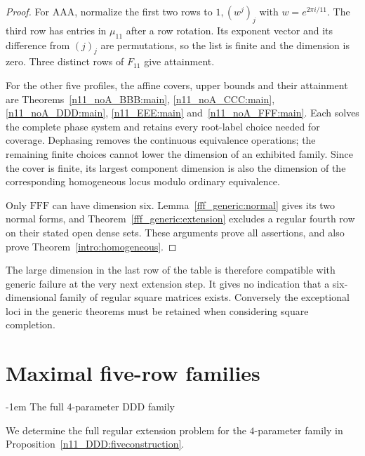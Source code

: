 \documentclass[11pt,a4paper]{article}
\makeatletter
\theoremstyle{plain}
\theoremstyle{definition}
\theoremstyle{plain}
\renewcommand\subsection{\@startsection{subsection}{2}{\z@}  {\medskipamount}  {-1em}  {\normalfont\normalsize\bfseries}}
\makeatother
\begin{document}
\begin{proof}
For $\mathrm{AAA}$, normalize the first two rows to $1,(w^j)_j$ with $w=e^{2\pi i/11}$. The third row has entries in $\mu_{11}$ after a row rotation. Its exponent vector and its difference from $(j)_j$ are permutations, so the list is finite and the dimension is zero. Three distinct rows of $F_{11}$ give attainment.

For the other five profiles, the affine covers, upper bounds and their attainment are Theorems~\ref{n11_noA_BBB:main}, \ref{n11_noA_CCC:main}, \ref{n11_noA_DDD:main}, \ref{n11_EEE:main} and~\ref{n11_noA_FFF:main}. Each solves the complete phase system and retains every root-label choice needed for coverage. Dephasing removes the continuous equivalence operations; the remaining finite choices cannot lower the dimension of an exhibited family. Since the cover is finite, its largest component dimension is also the dimension of the corresponding homogeneous locus modulo ordinary equivalence.

Only $\mathrm{FFF}$ can have dimension six. Lemma~\ref{fff_generic:normal} gives its two normal forms, and Theorem~\ref{fff_generic:extension} excludes a regular fourth row on their stated open dense sets. These arguments prove all assertions, and also prove Theorem~\ref{intro:homogeneous}.
\end{proof}

The large dimension in the last row of the table is therefore compatible with generic failure at the very next extension step. It gives no indication that a six-dimensional family of regular square matrices exists. Conversely the exceptional loci in the generic theorems must be retained when considering square completion.

\section{Maximal five-row families}\label{sec:order11part2}
\subsection{The full 4-parameter DDD family}\label{sec:DDDfull}

We determine the full regular extension problem for the $4$-parameter family in Proposition~\ref{n11_DDD:fiveconstruction}.
\end{document}
